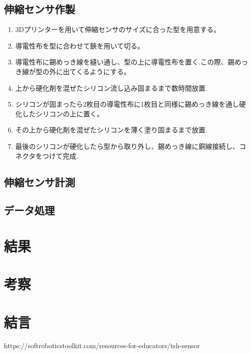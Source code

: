\subsection{伸縮センサ作製}
\begin{enumerate}
    \item 3Dプリンターを用いて伸縮センサのサイズに合った型を用意する。
    \item 導電性布を型に合わせて鋏を用いて切る。
    \item 導電性布に錫めっき線を縫い通し、型の上に導電性布を置く.この際、錫めっき線が型の外に出てくるようにする。
    \item 上から硬化剤を混ぜたシリコン流し込み固まるまで数時間放置.
    \item シリコンが固まったら2枚目の導電性布に1枚目と同様に錫めっき線を通し硬化したシリコンの上に置く。
    \item その上から硬化剤を混ぜたシリコンを薄く塗り固まるまで放置.
    \item 最後のシリコンが硬化したら型から取り外し、錫めっき線に銅線接続し、コネクタをつけて完成.
\end{enumerate}
\subsection{伸縮センサ計測}

\subsection{データ処理}

\section{結果}

\section{考察}

\section{結言}

\small
\begin{thebibliography}{99}
 https://softroboticstoolkit.com/resources-for-educators/tsh-sensor
\end{thebibliography}
\normalsize

